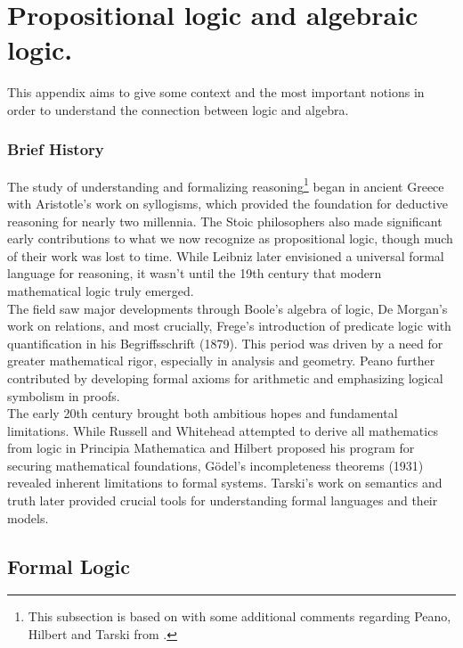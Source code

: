 \chapter{Propositional logic and algebraic logic.}

This appendix aims to give some context and the most important notions in order to understand the connection between logic and algebra. 

\subsection*{Brief History}

The study of understanding and formalizing reasoning\footnote{This subsection is based on \cite[p.~5-8]{ConciseLogicBook} with some additional comments regarding Peano, Hilbert and Tarski from \cite{MathLogicBook}.} began in ancient Greece with Aristotle's work on syllogisms, which provided the foundation for deductive reasoning for nearly two millennia. The Stoic philosophers also made significant early contributions to what we now recognize as propositional logic, though much of their work was lost to time. While Leibniz later envisioned a universal formal language for reasoning, it wasn't until the 19th century that modern mathematical logic truly emerged.\\

The field saw major developments through Boole's algebra of logic, De Morgan's work on relations, and most crucially, Frege's introduction of predicate logic with quantification in his Begriffsschrift (1879). This period was driven by a need for greater mathematical rigor, especially in analysis and geometry. Peano further contributed by developing formal axioms for arithmetic and emphasizing logical symbolism in proofs.\\

The early 20th century brought both ambitious hopes and fundamental limitations. While Russell and Whitehead attempted to derive all mathematics from logic in Principia Mathematica and Hilbert proposed his program for securing mathematical foundations, Gödel's incompleteness theorems (1931) revealed inherent limitations to formal systems. Tarski's work on semantics and truth later provided crucial tools for understanding formal languages and their models.\\

\section{Formal Logic}

